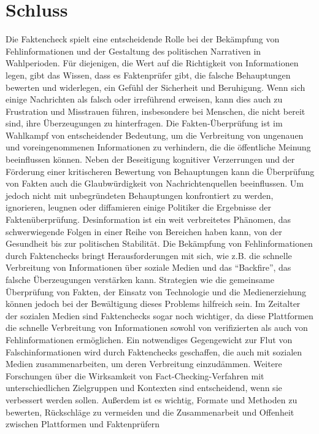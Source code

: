 \documentclass[a4paper,listof=totoc,bibliography=totoc]{scrartcl}
\begin{document}
\section{Schluss}

Die Faktencheck spielt eine entscheidende Rolle bei der Bekämpfung von Fehlinformationen und der Gestaltung des politischen Narrativen in Wahlperioden. 
Für diejenigen, die Wert auf die Richtigkeit von Informationen legen, gibt das Wissen, dass es Faktenprüfer gibt, die falsche Behauptungen bewerten und 
widerlegen, ein Gefühl der Sicherheit und Beruhigung. Wenn sich einige Nachrichten als falsch oder irreführend erweisen, kann dies auch zu Frustration und 
Misstrauen führen, insbesondere bei Menschen, die nicht bereit sind, ihre Überzeugungen zu hinterfragen. 
Die Fakten-Überprüfung ist im Wahlkampf von entscheidender Bedeutung, um die Verbreitung von ungenauen und voreingenommenen Informationen zu verhindern, die 
die öffentliche Meinung beeinflussen können. Neben der Beseitigung kognitiver Verzerrungen und der Förderung einer kritischeren Bewertung von Behauptungen 
kann die Überprüfung von Fakten auch die Glaubwürdigkeit von Nachrichtenquellen beeinflussen. Um jedoch nicht mit unbegründeten Behauptungen konfrontiert 
zu werden, ignorieren, leugnen oder diffamieren einige Politiker die Ergebnisse der Faktenüberprüfung. 
Desinformation ist ein weit verbreitetes Phänomen, das schwerwiegende Folgen in einer Reihe von Bereichen haben kann, von der Gesundheit bis zur politischen 
Stabilität. Die Bekämpfung von Fehlinformationen durch Faktenchecks bringt Herausforderungen mit sich, wie z.B. die schnelle Verbreitung von Informationen über 
soziale Medien und das ``Backfire'', das falsche Überzeugungen verstärken kann. Strategien wie die gemeinsame Überprüfung von Fakten, der Einsatz von Technologie 
und die Medienerziehung können jedoch bei der Bewältigung dieses Problems hilfreich sein. 
Im Zeitalter der sozialen Medien sind Faktenchecks sogar noch wichtiger, da diese Plattformen die schnelle Verbreitung von Informationen sowohl von verifizierten 
als auch von Fehlinformationen ermöglichen. Ein notwendiges Gegengewicht zur Flut von Falschinformationen wird durch Faktenchecks geschaffen, die auch mit sozialen 
Medien zusammenarbeiten, um deren Verbreitung einzudämmen.
\newline
\newline
Weitere Forschungen über die Wirksamkeit von Fact-Checking-Verfahren mit unterschiedlichen Zielgruppen und Kontexten sind entscheidend, wenn sie verbessert werden 
sollen. Außerdem ist es wichtig, Formate und Methoden zu bewerten, Rückschläge zu vermeiden und die Zusammenarbeit und Offenheit zwischen Plattformen und Faktenprüfern 
\end{document}

